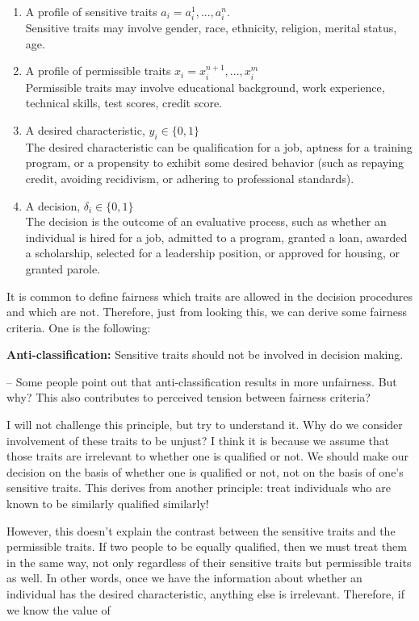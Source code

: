 \documentclass{article}
\begin{document}
\begin{enumerate}
    \item A profile of sensitive traits $a_i = {a_i^1,..., a_i^n}$. \\
    Sensitive traits may involve gender, race, ethnicity, religion, merital status, age.    
     \item A profile of permissible traits $x_i = {x_i^{n+1},..., x_i^m}$ \\
     Permissible traits may involve educational background, work experience, technical skills, test scores, credit score.
      \item A desired characteristic, $y_i \in \{0, 1\}$  \\
      The desired characteristic can be qualification for a job, aptness for a training program, or a propensity to exhibit some desired behavior (such as repaying credit, avoiding recidivism, or adhering to professional standards). 
      \item A decision, $\delta_i \in \{0, 1\}$  \\
      The decision is the outcome of an evaluative process, such as whether an individual is hired for a job, admitted to a program, granted a loan, awarded a scholarship, selected for a leadership position, or approved for housing, or granted parole. 
\end{enumerate}

It is common to define fairness which traits are allowed in the decision procedures and which are not. Therefore, just from looking this, we can derive some fairness criteria. One is the following: 

 \textbf{Anti-classification:} Sensitive traits should not be involved in decision making. 

-- Some people point out that anti-classification results in more unfairness. But why? This also contributes to perceived tension between fairness criteria? 
 

I will not challenge this principle, but try to understand it. Why do we consider involvement of these traits to be unjust? I think it is because we assume that those traits are irrelevant to whether one is qualified or not. We should make our decision on the basis of whether one is qualified or not, not on the basis of one's sensitive traits. This derives from another principle: treat individuals who are known to be similarly qualified similarly!

However, this doesn't explain the contrast between the sensitive traits and the permissible traits. If two people to be equally qualified, then we must treat them in the same way, not only regardless of their sensitive traits but permissible traits as well. In other words, once we have the information about whether an individual has the desired characteristic, anything else is irrelevant. Therefore, if we know the value of 
\end{document}
